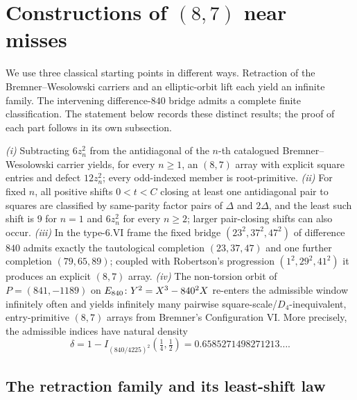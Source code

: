 \section{Constructions of $(8,7)$ near misses}\label{sec:families}

We use three classical starting points in different ways. Retraction of
the Bremner--Wesolowski carriers and an elliptic-orbit lift each yield an
infinite family. The intervening difference-$840$ bridge admits a complete
finite classification. The statement below records these distinct results;
the proof of each part follows in its own subsection.

\begin{theorem}\label{main:families}
\emph{(i)} Subtracting $6z_n^2$ from the antidiagonal of the $n$-th
catalogued Bremner--Wesolowski carrier yields, for every $n\ge1$, an
$(8,7)$ array with explicit square entries and defect $12z_n^2$; every
odd-indexed member is root-primitive. \emph{(ii)} For fixed $n$, all
positive shifts $0<t<C$ closing at least one antidiagonal pair to squares
are classified by same-parity factor pairs of $\Delta$ and $2\Delta$, and the
least such shift is $9$ for $n=1$ and $6z_n^2$ for every $n\ge2$; larger
pair-closing shifts can also occur. \emph{(iii)} In the type-6.VI frame the fixed bridge
$(23^2,37^2,47^2)$ of difference $840$ admits exactly the tautological
completion $(23,37,47)$ and one further completion $(79,65,89)$; coupled
with Robertson's progression $(1^2,29^2,41^2)$ it produces an explicit
$(8,7)$ array. \emph{(iv)} The non-torsion orbit of $P=(841,-1189)$ on
$E_{840}\colon Y^2=X^3-840^2X$ re-enters the admissible window infinitely
often and yields infinitely many pairwise square-scale/$D_4$-inequivalent,
entry-primitive $(8,7)$ arrays from Bremner's Configuration VI. More
precisely, the admissible indices have natural density
\[
\delta=1-I_{(840/4225)^2}\!\left(\tfrac14,\tfrac12\right)
=0.6585271498271213\ldots .
\]
\end{theorem}

\subsection{The retraction family and its least-shift law}

